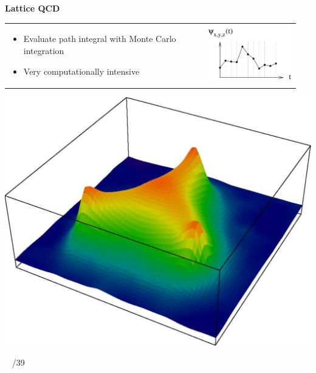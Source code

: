 \documentclass[landscape]{article}
\newenvironment{slide}[1][ ]{}{\mbox{ } \hfill \arabic{page}/39 \pagebreak}
\begin{document}
\begin{slide}
{\Huge \bf Lattice QCD}

\vspace{0.75 cm}
\begin{tabular}{p{0.65\linewidth} p{0.3\linewidth}}
\begin{minipage}{\linewidth}
\begin{itemize}

  \item Evaluate path integral with Monte Carlo integration

  \item Very computationally intensive

\end{itemize}
\end{minipage} &
\begin{minipage}{\linewidth}
\includegraphics[width=\linewidth]{pathintegrals}
\end{minipage}
\end{tabular}

\vfill

\begin{center}
\includegraphics[width=0.5\linewidth]{qcd_proton}
\end{center}

\end{slide}
\end{document}
